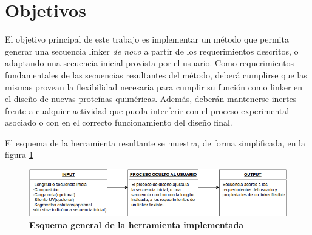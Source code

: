        
       
       
       
       
       
       
\section{Objetivos}

El objetivo principal de este trabajo es implementar un método que permita generar una secuencia linker \textit{de novo} a partir de los requerimientos descritos, o adaptando una secuencia inicial provista por el usuario. %
Como requerimientos fundamentales de las secuencias resultantes del método, deberá cumplirse que las mismas provean la flexibilidad necesaria para cumplir su función como linker en el diseño de nuevas proteínas quiméricas.
Además, deberán mantenerse inertes frente a cualquier actividad que pueda interferir con el proceso experimental asociado o con en el correcto funcionamiento del diseño final.


El esquema de la herramienta resultante se muestra, de forma simplificada, en la figura \ref{diagram}

\begin{figure}[h!]
\centering
   \includegraphics[width=\textwidth]{img/diagram.png}
 \caption{\textbf{Esquema general de la herramienta implementada}}
 \label{diagram}
\end{figure}


